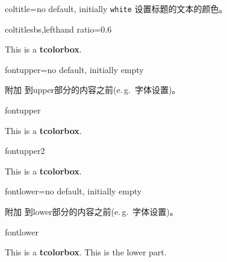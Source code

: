   
  \begin{docTcbKey}{coltitle}{=}{no default, initially \texttt{white}}
  设置标题的文本的颜色。
  \begin{exdispExample*}{coltitle}{sbs,lefthand ratio=0.6}
  \begin{tcolorbox}[coltitle=red!75!black,
  colbacktitle=black!10!white,title=Test]
  This is a \textbf{tcolorbox}.
  \end{tcolorbox}
  \end{exdispExample*}
  \end{docTcbKey}
  

  



\begin{docTcbKey}{fontupper}{=}{no default, initially empty}
  
  附加  到upper部分的内容之前(e.\,g.\ 字体设置)。
  \begin{exdispExample}{fontupper}
  \begin{tcolorbox}[fontupper=Hello!~\sffamily]
  This is a \textbf{tcolorbox}.
  \end{tcolorbox}
  \end{exdispExample}
  \begin{exdispExample}{fontupper2}
    \begin{tcolorbox}[fontupper=Hello!~]
    This is a \textbf{tcolorbox}.
    \end{tcolorbox}
    \end{exdispExample}
  \end{docTcbKey}
  
  
  \begin{docTcbKey}{fontlower}{=}{no default, initially empty}
  
  附加  到lower部分的内容之前(e.\,g.\ 字体设置)。
  \begin{exdispExample}{fontlower}
  \begin{tcolorbox}[fontlower=\sffamily\bfseries]
  This is a \textbf{tcolorbox}.
  \tcblower
  This is the lower part.
  \end{tcolorbox}
  \end{exdispExample}
  \end{docTcbKey}
  
